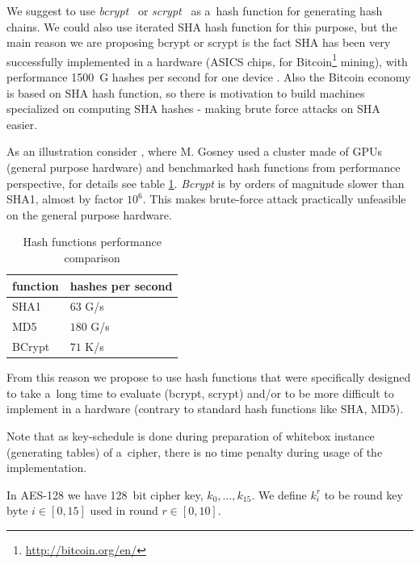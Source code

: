 \documentclass[11pt,oneside,final]{fithesis2}
\begin{document}
    We suggest to use \emph{bcrypt}~\citep{Provos99afuture-adaptable} or \emph{scrypt}~\citep{Percival_strongerkey} as a~hash function for generating hash chains. 
    We could also use iterated SHA hash function for this purpose, but the main reason we are proposing bcrypt or scrypt is the fact SHA has been
    very successfully implemented in a hardware (ASICS chips, for Bitcoin\footnote{\url{http://bitcoin.org/en/}} mining), with performance 1500~G hashes per second for one device \cite{shamining_web}.
    Also the Bitcoin economy is based on SHA hash function, so there is motivation to build machines specialized on computing SHA hashes - making
    brute force attacks on SHA easier.

    As an illustration consider \cite{bcrypthash}, where M. Gosney used a cluster made of GPUs (general purpose hardware) and benchmarked hash functions from performance perspective, for
    details see table \ref{tbl:hash_performance}. \emph{Bcrypt} is by orders of magnitude slower than SHA1, almost by factor $10^6$. This makes brute-force
    attack practically unfeasible on the general purpose hardware. 

    \begin{table}
    \begin{center}
    \begin{tabular}{ | l | l | }
 	\hline    
	function & hashes per second \\ \hline
	SHA1     & $63$ G/s \\ \hline
	MD5      & $180$ G/s \\ \hline
	BCrypt   & $71$ K/s \\   \hline
    \end{tabular}
    \caption{Hash functions performance comparison}
    \label{tbl:hash_performance}
    \end{center} 
    \end{table}

    From this reason we propose to use hash functions that were specifically designed to take a~long time to evaluate (bcrypt, scrypt) 
    and/or to be more difficult to implement in a hardware (contrary to standard hash functions like SHA, MD5).

    Note that as key-schedule is done during preparation of whitebox instance (generating tables) of a~cipher, there is no time penalty during 
    usage of the implementation.
        
    In AES-128 we have 128~bit cipher key, $k_0,\dots,k_{15}$. We define $k_i^r$ to be round key byte $i \in [0,15]$ used in round $r \in [0,10]$.
    
\end{document}

